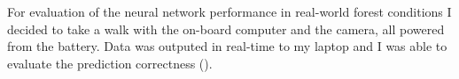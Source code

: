 For evaluation of the neural network performance in real-world forest conditions I decided to take a walk with the on-board computer and the camera, all powered from  the battery. Data was outputed in real-time to my laptop and I was able to evaluate the prediction correctness ().


\begin{figure}[!h]
  \begin{minipage}{.5\linewidth}
  \centering
  \end{minipage}
  \begin{minipage}{.5\linewidth}
  \centering	
  

  \end{minipage}
  

\end{figure}
